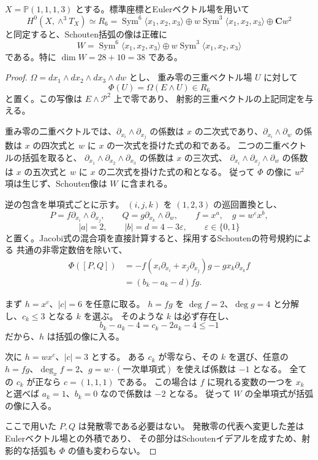 \begin{proposition}[Schouten像の三十八次元性の直接証明]
\label{prop:schouten-span-38-analytic-v31}
$X=\mathbb P(1,1,1,3)$ とする。標準座標とEulerベクトル場を用いて
\[
 H^0(X,\wedge^3T_X)\simeq
 R_6=\operatorname{Sym}^6\langle x_1,x_2,x_3\rangle
 \oplus w\operatorname{Sym}^3\langle x_1,x_2,x_3\rangle\oplus\mathbf Cw^2
\]
と同定すると、Schouten括弧の像は正確に
\[
 W=\operatorname{Sym}^6\langle x_1,x_2,x_3\rangle
   \oplus w\operatorname{Sym}^3\langle x_1,x_2,x_3\rangle
\]
である。特に $\dim W=28+10=38$ である。
\end{proposition}

\begin{proof}
$\Omega=dx_1\wedge dx_2\wedge dx_3\wedge dw$ とし、
重み零の三重ベクトル場 $U$ に対して
\[
 \Phi(U)=\Omega(E\wedge U)\in R_6
\]
と置く。この写像は $E\wedge\mathcal P^2$ 上で零であり、
射影的三重ベクトルの上記同定を与える。

重み零の二重ベクトルでは、$\partial_{x_i}\wedge\partial_{x_j}$ の係数は
$x$ の二次式であり、$\partial_{x_i}\wedge\partial_w$ の係数は
$x$ の四次式と $w$ に $x$ の一次式を掛けた式の和である。
二つの二重ベクトルの括弧を取ると、
$\partial_{x_1}\wedge\partial_{x_2}\wedge\partial_{x_3}$ の係数は $x$ の三次式、
$\partial_{x_i}\wedge\partial_{x_j}\wedge\partial_w$ の係数は
$x$ の五次式と $w$ に $x$ の二次式を掛けた式の和となる。
従って $\Phi$ の像に $w^2$ 項は生じず、Schouten像は $W$ に含まれる。

逆の包含を単項式ごとに示す。
$(i,j,k)$ を $(1,2,3)$ の巡回置換とし、
\[
 P=f\partial_{x_i}\wedge\partial_{x_j},\qquad
 Q=g\partial_{x_k}\wedge\partial_w,
 \qquad f=x^a,\quad g=w^\varepsilon x^b,
\]
\[
 |a|=2,\qquad |b|=d=4-3\varepsilon,\qquad \varepsilon\in\{0,1\}
\]
と置く。Jacobi式の混合項を直接計算すると、採用するSchoutenの符号規約による
共通の非零定数倍を除いて、
\begin{align*}
 \Phi([P,Q])
 &= -f(x_i\partial_{x_i}+x_j\partial_{x_j})g
    -gx_k\partial_{x_k}f\\
 &= (b_k-a_k-d)fg.
\end{align*}

まず $h=x^c$、$|c|=6$ を任意に取る。
$h=fg$ を $\deg f=2$、$\deg g=4$ と分解し、$c_k\le3$ となる $k$ を選ぶ。
そのような $k$ は必ず存在し、
\[
 b_k-a_k-4=c_k-2a_k-4\le-1
\]
だから、$h$ は括弧の像に入る。

次に $h=wx^c$、$|c|=3$ とする。
ある $c_k$ が零なら、その $k$ を選び、任意の
$h=fg$、$\deg_xf=2$、$g=w\cdot(\text{一次単項式})$ を使えば係数は $-1$ となる。
全ての $c_k$ が正なら $c=(1,1,1)$ である。
この場合は $f$ に現れる変数の一つを $x_k$ と選べば
$a_k=1$、$b_k=0$ なので係数は $-2$ となる。
従って $W$ の全単項式が括弧の像に入る。

ここで用いた $P,Q$ は発散零である必要はない。
発散零の代表へ変更した差はEulerベクトル場との外積であり、
その部分はSchoutenイデアルを成すため、射影的な括弧も $\Phi$ の値も変わらない。
\end{proof}
